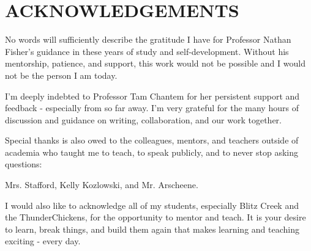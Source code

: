 \section*{ACKNOWLEDGEMENTS}
\begin{center}
No words will sufficiently describe the gratitude I have for Professor Nathan Fisher's guidance in these years of study and self-development.
Without his mentorship, patience, and support, this work would not be possible and I would not be the person I am today.

I'm deeply indebted to Professor Tam Chantem for her persistent support and feedback - especially from so far away.
I'm very grateful for the many hours of discussion and guidance on writing, collaboration, and our work together.

Special thanks is also owed to the colleagues, mentors, and teachers outside of academia who taught me to teach, to speak publicly, and to never stop asking questions:

Mrs. Stafford,
Kelly Kozlowski,
and Mr. Arscheene.

I would also like to acknowledge all of my students, especially Blitz Creek and the ThunderChickens, for the opportunity to mentor and teach.
It is your desire to learn, break things, and build them again that makes learning and teaching exciting - every day.
  
\end{center}